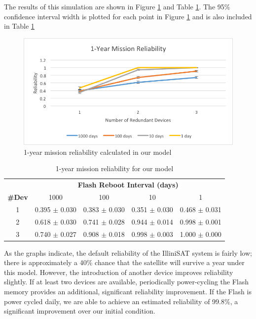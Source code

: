 The results of this simulation are shown in Figure \ref{fig:reliability} and Table \ref{tab:reliability}.  The 95\% confidence interval width is plotted for each point in Figure \ref{fig:reliability} and is also included in Table \ref{tab:reliability}

\begin{figure}[width = 0.5\textwidth]
\centering
\includegraphics[scale=0.6]{reliability}
\caption{1-year mission reliability calculated in  our model}\label{fig:reliability}
\end{figure}

\begin{table}[width = 0.5\textwidth]
{\scriptsize
\centering
\begin{tabular}{ccccc}
\toprule
& \multicolumn{4}{c}{\bf Flash Reboot Interval (days)}\\
\cmidrule(r){2-5}
{\bf \#Dev} & 1000 & 100 & 10 & 1\\
\midrule
1 & 0.395 $\pm$ 0.030 & 0.383 $\pm$ 0.030 & 0.351 $\pm$ 0.030 & 0.468 $\pm$ 0.031 \\
2 & 0.618 $\pm$ 0.030 & 0.741 $\pm$ 0.028 & 0.944 $\pm$ 0.014 & 0.998 $\pm$ 0.001 \\
3 & 0.740 $\pm$ 0.027 & 0.908 $\pm$ 0.018 & 0.998 $\pm$ 0.003 & 1.000 $\pm$ 0.000 \\
\bottomrule
\end{tabular}
\caption{1-year mission reliability for our model}\label{tab:reliability}
}
\end{table}

As the graphs indicate, the default reliability of the IlliniSAT system is fairly low; there is approximately a 40\% chance that the satellite will survive a year under this model.  However, the introduction of another device improves reliability slightly.  If at least two devices are available, periodically power-cycling the Flash memory provides an additional, significant reliability improvement.  If the Flash is power cycled daily, we are able to achieve an estimated reliability of 99.8\%, a significant improvement over our initial condition.

